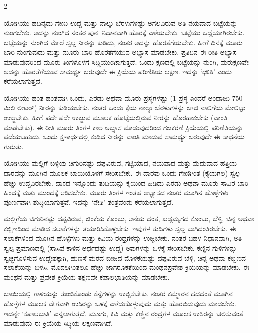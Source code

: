 \begin{multicols}{2}
\begin{kan}

ಯೋಗಿಯು ಹದಿನೈದು ಗೇಣು ಉದ್ದ ಮತ್ತು ನಾಲ್ಕು ಬೆರಳುಗಳಷ್ಟು ಅಗಲವಿರುವ ಅತಿ ನಯವಾದ ಬಟ್ಟೆಯನ್ನು ನುಂಗಬೇಕು. ಅದನ್ನು ನುಂಗಿದ ನಂತರ ಪುನಃ ನಿಧಾನವಾಗಿ ಹೊರಕ್ಕೆ ಎಳೆಯಬೇಕು. ಬಟ್ಟೆಯು ಒದ್ದೆಯಾಗಿರಬೇಕು. ಬಟ್ಟೆಯನ್ನು ನುಂಗಿದ ಮೇಲೆ ಸ್ವಲ್ಪ ನೀರನ್ನು ಕುಡಿದು, ನಂತರ ಅದನ್ನು ಹೊರತೆಗೆಯಬೇಕು. ಹೀಗೆ ದಿನಕ್ಕೆ ಮೂರು ಬಾರಿ ನುಂಗುವುದು ಮತ್ತು ಮೂರು ಬಾರಿ ಹೊರತೆಗೆಯುವ ಅಭ್ಯಾಸ ಮಾಡಬೇಕು. ಪ್ರತಿದಿನ ಈ ರೀತಿ ಅಭ್ಯಾಸ ಮಾಡುವುದರಿಂದ ಮೂರು ತಿಂಗಳೊಳಗೆ ಸಿದ್ಧಿಯುಂಟಾಗುತ್ತದೆ. ಒಂದು ಕ್ಷಣದಲ್ಲಿ ಬಟ್ಟೆಯನ್ನು ನುಂಗಿ, ಮರುಕ್ಷಣವೇ ಅದನ್ನು ಹೊರತೆಗೆಯುವ ಸಾಮರ್ಥ್ಯ ಬರುವುದೇ ಈ ಕ್ರಿಯೆಯ ಪರಿಣಿತಿಯ ಲಕ್ಷಣ. ಇದನ್ನು ‘ಧೌತಿ’ ಎಂದು ಕರೆಯಲಾಗುತ್ತದೆ.
\vskip 7pt


ಯೋಗಿಯು ಹಂತ ಹಂತವಾಗಿ ಒಂದು, ಎರಡು ಅಥವಾ ಮೂರು ಪ್ರಸ್ಥಗಳಷ್ಟು (1 ಪ್ರಸ್ಥ ಎಂದರೆ ಅಂದಾಜು 750 ಮಿಲಿ ಲೀಟರ್) ನೀರನ್ನು ಕುಡಿಯಬೇಕು. ನಂತರ ಒಂದು ಕೈಯ ನಾಲ್ಕು ಬೆರಳುಗಳನ್ನು ಚಾಚಿ ನಾಲಿಗೆಯ ಮೇಲಿಟ್ಟು ಉಜ್ಜಬೇಕು. ಹೀಗೆ ಪದೇ ಪದೇ ಉಜ್ಜುವ ಮೂಲಕ ಹೊಟ್ಟೆಯಲ್ಲಿರುವ ನೀರನ್ನು ಹೊರಹಾಕಬೇಕು (ವಾಂತಿ ಮಾಡಬೇಕು). ಈ ರೀತಿ ಮೂರು ತಿಂಗಳ ಕಾಲ ಅಭ್ಯಾಸ ಮಾಡುವುದರಿಂದ ಗಜಕರಣಿ ಕ್ರಿಯೆಯಲ್ಲಿ ಪರಿಣಿತಿಯನ್ನು ಪಡೆಯಬಹುದು. ಒಂದು ಕ್ಷಣಾರ್ಧದಲ್ಲಿ ಕುಡಿದ ನೀರನ್ನು ವಾಂತಿ ಮಾಡುವ ಸಾಮರ್ಥ್ಯ ಬರುವುದೇ ಈ ಸಾಧನೆಯ ಗುರುತು.
\vskip 7pt


ಯೋಗಿಯು ಮಲ್ಲಿಗೆ ಬಳ್ಳಿಯ ಚಿಗುರಿನಷ್ಟು ದಪ್ಪವಿರುವ, ಗಟ್ಟಿಯಾದ, ನಯವಾದ ಮತ್ತು ಮೆದುವಾದ ಹತ್ತಿಯ ದಾರವನ್ನು ಮೂಗಿನ ಮೂಲಕ ಬಾಯಿಯೊಳಗೆ ಸೇರಿಸಬೇಕು. ಈ ದಾರವು ಒಂದು ಗೇಣಿಗಿಂತ (ಕೈಯಗಲ) ಸ್ವಲ್ಪ ಹೆಚ್ಚು ಉದ್ದವಿರಬೇಕು. ದಾರದ ಇನ್ನೊಂದು ತುದಿಯನ್ನು ಕೈಯಿಂದ ಹಿಡಿದು ಎರಡು ಅಥವಾ ಮೂರು ಸಾವಿರ ಬಾರಿ ಹಿಂದಕ್ಕೆ ಮತ್ತು ಮುಂದಕ್ಕೆ ಆಡಿಸಬೇಕು. ಮೂರು ತಿಂಗಳ ಇಂತಹ ಅಭ್ಯಾಸದ ನಂತರ ಮೂಗಿನ ಹೊಳ್ಳೆಗಳು ಪೂರ್ಣವಾಗಿ ಶುದ್ಧಿಯಾಗುತ್ತವೆ. ಇದನ್ನು ‘ನೇತಿ’ ತಂತ್ರವೆಂದು ಕರೆಯಲಾಗುತ್ತದೆ.
\columnbreak


ಮಲ್ಲಿಗೆಯ ಚಿಗುರಿನಷ್ಟು ದಪ್ಪವಿರುವ, ಜಿಂಕೆಯ ಕೊಂಬು, ಆನೆಯ ದಂತ, ಖಡ್ಗಮೃಗದ ಕೊಂಬು, ಬೆಳ್ಳಿ, ಚಿನ್ನ ಅಥವಾ ಕಬ್ಬಿಣದಿಂದ ಮಾಡಿದ ಸಲಾಕೆಗಳನ್ನು ತಯಾರಿಸಿಕೊಳ್ಳಬೇಕು. ಇವುಗಳ ತುದಿಗಳು ಸ್ವಲ್ಪ ಬಾಗಿದಂತಿರಬೇಕು. ಈ ಸಲಾಕೆಗಳಿಂದ ಮೂಗಿನ ಹೊಳ್ಳೆಗಳು ಮತ್ತು ಕಿವಿಯ ರಂಧ್ರಗಳನ್ನು ಉಜ್ಜಬೇಕು. ನಂತರ ಬಹಳ ನಿಧಾನವಾಗಿ, ಅತಿ ಸ್ವಲ್ಪ ಪ್ರಮಾಣದಲ್ಲಿ (ಸಾಸಿವೆ ಕಾಳಿನ ಅರ್ಧದಷ್ಟು ಉದ್ದ) ಅವುಗಳನ್ನು ಒಳಕ್ಕೆ ಸೇರಿಸಬೇಕು. ಕಣ್ಣಿನ ಗುಳಿಗಳನ್ನು ಸ್ವಚ್ಛಗೊಳಿಸುವ ಉದ್ದೇಶಕ್ಕಾಗಿ, ಹುಣಸೆ ಮರದ ಬೀಜದ ಮೊಳಕೆಯಷ್ಟು ದಪ್ಪವಿರುವ ಬೆಳ್ಳಿ, ಚಿನ್ನ ಅಥವಾ ಕಬ್ಬಿಣದ ಸಲಾಕೆಯನ್ನು ಬಳಸಿ, ಮೊದಲಿಗಿಂತಲೂ ಹೆಚ್ಚು ಜಾಗರೂಕತೆಯಿಂದ ಮಂಥನಪ್ರವೇಶ ಕ್ರಿಯೆಯನ್ನು ಮಾಡಬೇಕು. ಈ ಮಂಥನ ಮತ್ತು ಪ್ರವೇಶ ಕ್ರಿಯೆಯ ತಕ್ಷಣವೇ ಕಪಾಲಭಾತಿಯನ್ನು ಮಾಡಬೇಕು.
\vskip 7pt


ಬಾಯಿಯಲ್ಲಿ ಗಾಳಿಯನ್ನು ತುಂಬಿಕೊಂಡು ಕೆನ್ನೆಗಳನ್ನು ಉಬ್ಬಿಸಬೇಕು. ನಂತರ ಕಮ್ಮಾರನ ಹದದಂತೆ ಮೂಗಿನ ಹೊಳ್ಳೆಗಳ ಮೂಲಕ ವೇಗವಾಗಿ ಉಸಿರನ್ನು ಒಳಕ್ಕೆ ಎಳೆದುಕೊಳ್ಳುವುದು ಮತ್ತು ಹೊರಬಿಡುವುದು ಮಾಡಬೇಕು. ಇದನ್ನೇ ‘ಕಪಾಲಭಾತಿ’ ಎನ್ನಲಾಗುತ್ತದೆ. ಮೂಗು, ಕಿವಿ ಮತ್ತು ಕಣ್ಣಿನ ರಂಧ್ರಗಳ ಮೂಲಕ ಉಸಿರನ್ನು ಚಲಿಸುವಂತೆ ಮಾಡುವುದು ಈ ಕ್ರಿಯೆಯ ಸಿದ್ಧಿಯ ಲಕ್ಷಣವಾಗಿದೆ.
\vskip 7pt


\end{kan}
\end{multicols}
